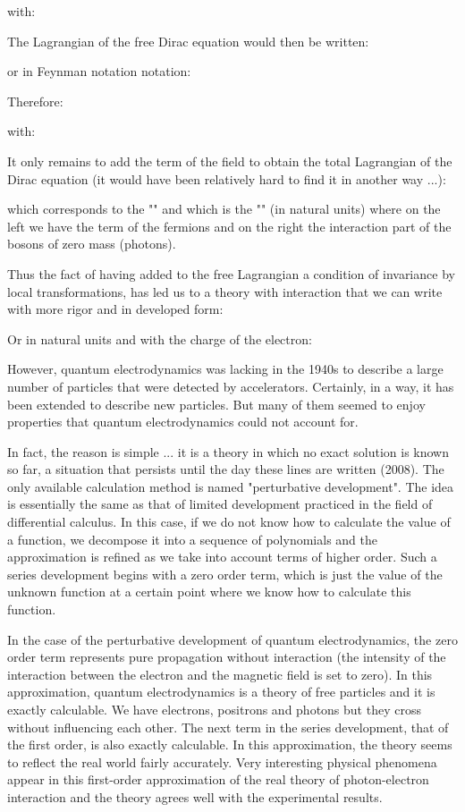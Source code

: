 	with:
	
	The Lagrangian of the free Dirac equation would then be written:
	
	or in Feynman notation notation:
	
	Therefore:
	
	with:
	
	It only remains to add the term of the field to obtain the total Lagrangian of the Dirac equation (it would have been relatively hard to find it in another way ...):
	
	which corresponds to the "" and which is the "" (in natural units) where on the left we have the term of the fermions and on the right the interaction part of the bosons of zero mass (photons).

	Thus the fact of having added to the free Lagrangian a condition of invariance by local transformations, has led us to a theory with interaction that we can write with more rigor and in developed form:
	
	Or in natural units and with the charge of the electron:
	
	However, quantum electrodynamics was lacking in the 1940s to describe a large number of particles that were detected by accelerators. Certainly, in a way, it has been extended to describe new particles. But many of them seemed to enjoy properties that quantum electrodynamics could not account for.

	In fact, the reason is simple ... it is a theory in which no exact solution is known so far, a situation that persists until the day these lines are written (2008). The only available calculation method is named "perturbative development". The idea is essentially the same as that of limited development practiced in the field of differential calculus. In this case, if we do not know how to calculate the value of a function, we decompose it into a sequence of polynomials and the approximation is refined as we take into account terms of higher order. Such a series development begins with a zero order term, which is just the value of the unknown function at a certain point where we know how to calculate this function.
	
	In the case of the perturbative development of quantum electrodynamics, the zero order term represents pure propagation without interaction (the intensity of the interaction between the electron and the magnetic field is set to zero). In this approximation, quantum electrodynamics is a theory of free particles and it is exactly calculable. We have electrons, positrons and photons but they cross without influencing each other. The next term in the series development, that of the first order, is also exactly calculable. In this approximation, the theory seems to reflect the real world fairly accurately. Very interesting physical phenomena appear in this first-order approximation of the real theory of photon-electron interaction and the theory agrees well with the experimental results.

